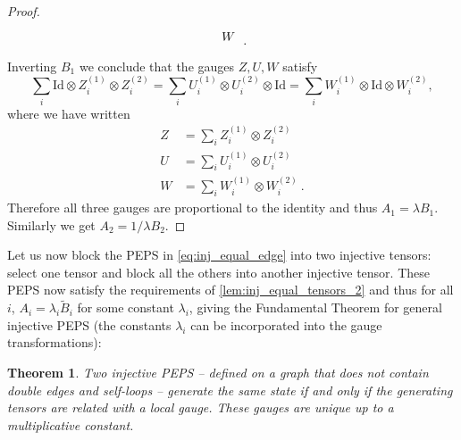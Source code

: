 \documentclass[preprint, superscriptaddress,a4paper,longbibliography]{revtex4-1}
\newtheorem{theorem}{Theorem}
\theoremstyle{definition}
\newcommand{\id}{\mathrm{Id}}
\begin{document}
\begin{proof}
\begin{equation*}
\begin{tikzpicture}
            \node at (-7.5:0.9) {$W$};
        \end{tikzpicture} \ .
    \end{equation*}
    Inverting $B_1$ we conclude that the gauges $Z,U,W$ satisfy
    \begin{equation*}
        \sum_i \id \otimes Z^{(1)}_i \otimes Z^{(2)}_i= \sum_i  U^{(1)}_i \otimes U^{(2)}_i \otimes \id = \sum_i  W^{(1)}_i \otimes \id  \otimes W^{(2)}_i ,
    \end{equation*}
    where we have written
    \begin{align*}
        Z & =\sum_i Z_i^{(1)}\otimes Z_i^{(2)}     \\
        U & =\sum_i U_i^{(1)}\otimes U_i^{(2)}     \\
        W & =\sum_i W_i^{(1)}\otimes W_i^{(2)} \ .
    \end{align*}
    Therefore all three gauges are proportional to the identity and thus $A_1 = \lambda B_1$. Similarly we get $A_2 = 1/\lambda B_2$.
\end{proof}

Let us now block the PEPS in \cref{eq:inj_equal_edge} into two injective tensors: select one tensor and block all the others into another injective tensor. These PEPS now satisfy the requirements of  \cref{lem:inj_equal_tensors_2} and thus for all $i$, $A_i = \lambda_i \tilde{B}_i$ for some constant $\lambda_i$, giving the Fundamental Theorem for general injective PEPS (the constants $\lambda_i$ can be incorporated into the gauge transformations):
\begin{theorem}\label{thm:inj}
    Two injective PEPS  -- defined on a graph that does not contain double edges and self-loops -- generate the same state if and only if the generating tensors are related with a local gauge. These gauges are unique up to a multiplicative constant.
\end{theorem}
\end{document}
